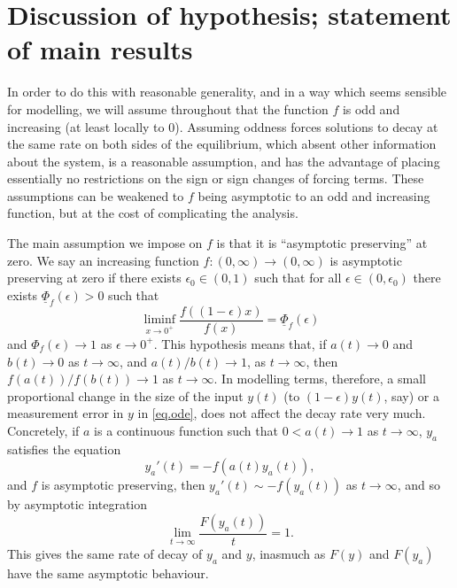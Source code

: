 \documentclass[a4paper,10pt,reqno]{amsart}
\numberwithin{equation}{section}
\theoremstyle{definition}
\theoremstyle{remark}
\DeclareMathOperator{\1}{\mathbbm 1}
\begin{document}
	\section{Discussion of hypothesis; statement of main results}
	In order to do this with reasonable generality, and in a way which seems sensible for modelling, we will assume throughout that the function $f$ is odd and increasing (at least locally to $0$). Assuming oddness forces solutions to decay at the same rate on both sides of the equilibrium, which absent other information about the system, is a reasonable assumption, and has the advantage of placing essentially no restrictions on the sign or sign changes of forcing terms. These assumptions can be weakened to $f$ being asymptotic to an odd and increasing function, but at the cost of complicating the analysis. 
	
	The main assumption we impose on $f$ is that it is ``asymptotic preserving'' at zero. We say an  increasing function $f:(0,\infty)\to (0,\infty)$ is asymptotic preserving at zero if there exists $\epsilon_0\in (0,1)$ such that for all $\epsilon\in (0,\epsilon_0)$ there exists $\underline{\Phi}_f(\epsilon)>0$ such that 
	\begin{equation} \label{eq.fasypres}
		\liminf_{x\to 0^+} \frac{f((1-\epsilon)x)}{f(x)}= \underline{\Phi}_f(\epsilon)
	\end{equation}
	and $\Phi_f(\epsilon)\to 1$ as $\epsilon\to 0^+$. This hypothesis means that, if $a(t)\to 0$ and $b(t)\to 0$ as $t\to\infty$, and $a(t)/b(t)\to 1$, as $t\to\infty$, then $f(a(t))/f(b(t))\to 1$ as $t\to\infty$. In modelling terms, therefore, a small proportional change in the size of the input $y(t)$ (to $(1-\epsilon)y(t)$, say) or a measurement error in $y$ in \eqref{eq.ode}, does not affect the decay rate very much. Concretely, if $a$ is a continuous function such that  $0<a(t)\to 1$ as $t\to\infty$, $y_a$ satisfies the equation 
	\[
	y_a'(t)=-f(a(t)y_a(t)),
	\]  
	and $f$ is asymptotic preserving, then $y_a'(t)\sim -f(y_a(t))$ as $t\to\infty$, and so by asymptotic integration 
	\[
	\lim_{t\to\infty} \frac{F(y_a(t))}{t}=1.
	\]
	This gives the same rate of decay of $y_a$ and $y$, inasmuch as $F(y)$ and $F(y_a)$ have the same asymptotic behaviour. 
	
\end{document}
